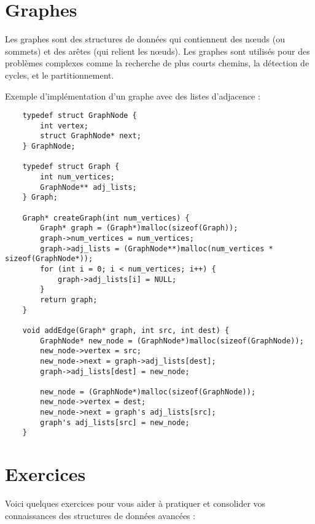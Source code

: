 \section{Graphes}
Les graphes sont des structures de données qui contiennent des nœuds (ou sommets) et des arêtes (qui relient les nœuds). Les graphes sont utilisés pour des problèmes complexes comme la recherche de plus courts chemins, la détection de cycles, et le partitionnement.

Exemple d'implémentation d'un graphe avec des listes d'adjacence :

\begin{lstlisting}
	typedef struct GraphNode {
		int vertex;
		struct GraphNode* next;
	} GraphNode;
	
	typedef struct Graph {
		int num_vertices;
		GraphNode** adj_lists;
	} Graph;
	
	Graph* createGraph(int num_vertices) {
		Graph* graph = (Graph*)malloc(sizeof(Graph));
		graph->num_vertices = num_vertices;
		graph->adj_lists = (GraphNode**)malloc(num_vertices * sizeof(GraphNode*));
		for (int i = 0; i < num_vertices; i++) {
			graph->adj_lists[i] = NULL;
		}
		return graph;
	}
	
	void addEdge(Graph* graph, int src, int dest) {
		GraphNode* new_node = (GraphNode*)malloc(sizeof(GraphNode));
		new_node->vertex = src;
		new_node->next = graph->adj_lists[dest];
		graph->adj_lists[dest] = new_node;
		
		new_node = (GraphNode*)malloc(sizeof(GraphNode));
		new_node->vertex = dest;
		new_node->next = graph's adj_lists[src];
		graph's adj_lists[src] = new_node;
	}
\end{lstlisting}

\section{Exercices}
Voici quelques exercices pour vous aider à pratiquer et consolider vos connaissances des structures de données avancées :


